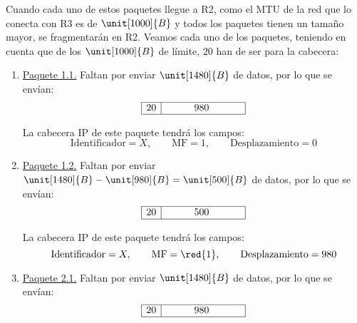 \begin{ejemplo}
    Cuando cada uno de estos paquetes llegue a R2, como el \acrshort{MTU} de la red que lo conecta con R3 es de $\unit[1000]{B}$ y todos los paquetes tienen un tamaño mayor, se fragmentarán en R2. Veamos cada uno de los paquetes, teniendo en cuenta que de los $\unit[1000]{B}$ de límite, $20$ han de ser para la cabecera:
    \begin{enumerate}
        \item \ul{Paquete 1.1.} Faltan por enviar $\unit[1480]{B}$ de datos, por lo que se envían:
        \begin{equation*}
            \begin{array}{|c|c|}
                \hline 20 & \hspace{1cm} 980 \hspace{1cm}~\\ \hline
            \end{array}
        \end{equation*}

        La cabecera IP de este paquete tendrá los campos:
        \begin{equation*}
            \text{Identificador} = X,\qquad \text{MF} = 1,\qquad \text{Desplazamiento} = 0
        \end{equation*}

        \item \ul{Paquete 1.2.} Faltan por enviar $\unit[1480]{B}-\unit[980]{B}=\unit[500]{B}$ de datos, por lo que se envían:
        \begin{equation*}
            \begin{array}{|c|c|}
                \hline 20 & \hspace{1cm} 500 \hspace{1cm}~\\ \hline
            \end{array}
        \end{equation*}

        La cabecera IP de este paquete tendrá los campos:
        \begin{equation*}
            \text{Identificador} = X,\qquad \text{MF} = \red{1},\qquad \text{Desplazamiento} = 980
        \end{equation*}

        \item \ul{Paquete 2.1.} Faltan por enviar $\unit[1480]{B}$ de datos, por lo que se envían:
        \begin{equation*}
            \begin{array}{|c|c|}
                \hline 20 & \hspace{1cm} 980 \hspace{1cm}~\\ \hline
            \end{array}
        \end{equation*}


\end{enumerate}
\end{ejemplo}
